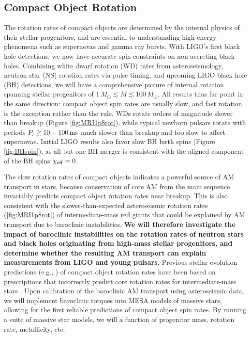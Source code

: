 {\color{orange}

\subsection{Compact Object Rotation}

}

The rotation rates of compact objects are determined by the internal physics of their stellar progenitors, and are essential to understanding high energy phenomena such as supernovae and gamma ray bursts. With LIGO's first black hole detections, we now have accurate spin constraints on non-accreting black holes. Combining white dwarf rotation (WD) rates from asteroseismology, neutron star (NS) rotation rates via pulse timing, and upcoming LIGO black hole (BH) detections, we will have a comprehensive picture of internal rotation spanning stellar progenitors of $1 \, M_\odot \! \lesssim \! M \! \lesssim \! 100 \, M_\odot$. All results thus far point in the same direction: compact object spin rates are usually slow, and fast rotation is the exception rather than the rule. WDs rotate orders of magnitude slower than breakup (Figure \ref{fig:MRI1p8rot}), while typical newborn pulsars rotate with periods $P_{i} \gtrsim 10-100 \, {\rm ms}$ \citep{faucher:06,igoshev:13,gullon:14} much slower than breakup and too slow to affect  supernovae. Initial LIGO results also favor slow BH birth spins (Figure \ref{fig:BHspin}), as all but one BH merger is consistent with the aligned component of the BH spins $\chi_{\rm eff} = 0$.


The slow rotation rates of compact objects indicates a powerful source of AM transport in stars, because conservation of core AM from the main sequence invariably predicts compact object rotation rates near breakup. This is also consistent with the slower-than-expected asteroseismic rotation rates (\ref{fig:MRI1p8rot}) of intermediate-mass red giants that could be explained by AM transport due to baroclinic instabilities. {\bf We will therefore investigate the impact of baroclinic instabilities on the rotation rates of neutron stars and black holes originating from high-mass stellar progenitors, and determine whether the resulting AM transport can explain measurements from LIGO and young pulsars.} Previous stellar evolution predictions (e.g., \citealt{heger:00}) of compact object rotation rates have been based on prescriptions that incorrectly predict core rotation rates for intermediate-mass stars \citep{cantiello:14}. Upon calibration of the baroclinic AM transport using asteroseismic data, we will implement baroclinic torques into MESA models of massive stars, allowing for the first reliable predictions of compact object spin rates. By running a suite of massive star models, we will a function of progenitor mass, rotation rate, metallicity, etc.

